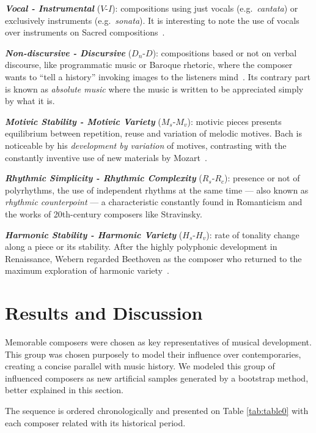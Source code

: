 \documentclass[
 aip,
 jmp,
 amsmath,amssymb,
 reprint,
]{revtex4-1}
\begin{document}
{\bf \em{ Vocal - Instrumental}} ($V$-$I$): compositions using just vocals
(e.g.\ \emph{cantata}) or exclusively instruments
(e.g.\ \emph{sonata}). It is interesting to note the use of
vocals over instruments on Sacred compositions~\cite{Lovelock}.

{\bf \em{ Non-discursive - Discursive}} ($D_n$-$D$): compositions
based or not
on verbal discourse, like programmatic music or Baroque rhetoric, where the composer wants
to ``tell a history'' invoking images to the listeners
mind~\cite{BennettHistory}. Its contrary part is known as
\textit{absolute music} where the music is written to be appreciated simply
by what it is.

{\bf \em{ Motivic Stability - Motivic Variety}} ($M_s$-$M_v$): motivic pieces presents equilibrium
between repetition, reuse and variation of melodic motives. Bach is noticeable by his
\textit{development by variation} of motives, contrasting with the
constantly inventive use of new materials by Mozart~\cite{Webern}.

{\bf \em{ Rhythmic Simplicity - Rhythmic Complexity}} ($R_s$-$R_c$): presence or not of polyrhythms, the
use of independent rhythms at the same time --- also known as
\textit{rhythmic counterpoint}\cite{BennettHistory} --- a characteristic
constantly found in Romanticism and the works of 20th-century composers like Stravinsky.

{\bf \em{ Harmonic Stability - Harmonic Variety}} ($H_s$-$H_v$):
rate of tonality change along a piece or its stability. After the highly
polyphonic development in Renaissance, Webern regarded Beethoven as the
composer who returned to the maximum exploration of harmonic variety~\cite{Webern}.

\section{Results and Discussion}
\label{sec:results}

Memorable composers were chosen as key representatives
of musical development. 
This group was chosen purposely to model their influence
over contemporaries, creating a concise parallel with music history. We modeled this group of influenced
composers as new artificial samples generated by a bootstrap method, better
explained in this section.

The sequence
is ordered chronologically and presented on Table \ref{tab:table0} with
each composer related with its historical period.
\end{document}
